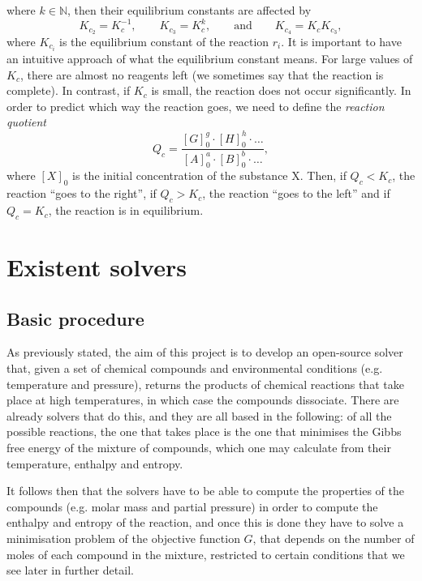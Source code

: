 \documentclass[a4paper,10pt]{article}
\newcommand{\mN}{{\mathbb N}}
\theoremstyle{plain}
\theoremstyle{definition}
\theoremstyle{remark}
\newcommand{\quotes}[1]{``#1''}
\begin{document}
where $k\in\mN$, then their equilibrium constants are affected by
\begin{equation}
K_{c_{2}} = K_c^{-1}, \qquad K_{c_{3}} = K_c^k, \qquad \text{and} \qquad K_{c_{4}} = K_c K_{c_{3}},
\end{equation}
where $K_{c_i}$ is the equilibrium constant of the reaction $r_i$.
It is important to have an intuitive approach of what the equilibrium constant means. For large values of $K_c$, there are almost no reagents left (we sometimes say that the reaction is complete). In contrast, if $K_c$ is small, the reaction does not occur significantly. In order to predict which way the reaction goes, we need to define the \textit{reaction quotient}
\begin{equation}
Q_c= \frac{[G]_0^g\cdot [H]_0^h\cdot\dots}{[A]_0^a\cdot [B]_0^b\cdot\dots},
\end{equation}
where $[X]_0$ is the initial concentration of the substance X. Then, if $Q_c<K_c$, the reaction \quotes{goes to the right}, if $Q_c>K_c$, the reaction \quotes{goes to the left} and if $Q_c=K_c$, the reaction is in equilibrium.
\section{Existent solvers}
\subsection{Basic procedure}
As previously stated, the aim of this project is to develop an open-source solver that, given a set of chemical compounds and environmental conditions (e.g. temperature and pressure), returns the products of chemical reactions that take place at high temperatures, in which case the compounds dissociate. There are already solvers that do this, and they are all based in the following: of all the possible reactions, the one that takes place is the one that minimises the Gibbs free energy of the mixture of compounds, which one may calculate from their temperature, enthalpy and entropy.

It follows then that the solvers have to be able to compute the properties of the compounds (e.g. molar mass and partial pressure) in order to compute the enthalpy and entropy of the reaction, and once this is done they have to solve a minimisation problem of the objective function $G$, that depends on the number of moles of each compound in the mixture, restricted to certain conditions that we see later in further detail.
\end{document}
